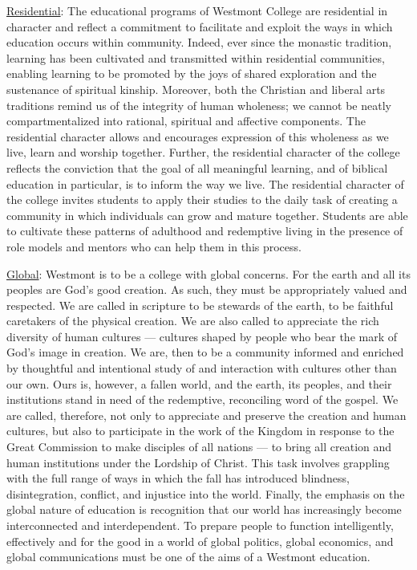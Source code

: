 \documentclass[letterpaper, 11pt]{article}
\begin{document}
  \underline{Residential}:  The educational programs of Westmont College are residential in character and reflect a commitment to facilitate and exploit the ways in which education occurs within community.  Indeed, ever since the monastic tradition, learning has been cultivated and transmitted within residential communities, enabling learning to be promoted by the joys of shared exploration and the sustenance of spiritual kinship.  Moreover, both the Christian and liberal arts traditions remind us of the integrity of human wholeness; we cannot be neatly compartmentalized into rational, spiritual and affective components.  The residential character allows and encourages expression of this wholeness as we live, learn and worship together.  Further, the residential character of the college reflects the conviction that the goal of all meaningful learning, and of biblical education in particular, is to inform the way we live.  The residential character of the college invites students to apply their studies to the daily task of creating a community in which individuals can grow and mature together.  Students are able to cultivate these patterns of adulthood and redemptive living in the presence of role models and mentors who can help them in this process.
  
\underline{Global}:  Westmont is to be a college with global concerns.  For the earth and all its peoples are God's good creation.  As such, they must be appropriately valued and respected.  We are called in scripture to be stewards of the earth, to be faithful caretakers of the physical creation.  We are also called to appreciate the rich diversity of human cultures --- cultures shaped by people who bear the mark of God's image in creation.  We are, then to be a community informed and enriched by thoughtful and intentional study of and interaction with cultures other than our own.  Ours is, however, a fallen world, and the earth, its peoples, and their institutions stand in need of the redemptive, reconciling word of the gospel.  We are called, therefore, not only to appreciate and preserve the creation and human cultures, but also to participate in the work of the Kingdom in response to the Great Commission to make disciples of all nations --- to bring all creation and human institutions under the Lordship of Christ.  This task involves grappling with the full range of ways in which the fall has introduced blindness, disintegration, conflict, and injustice into the world.  Finally, the emphasis on the global nature of education is recognition that our world has increasingly become interconnected and interdependent.  To prepare people to function intelligently, effectively and for the good in a world of global politics, global economics, and global communications must be one of the aims of a Westmont education.
\end{document}
